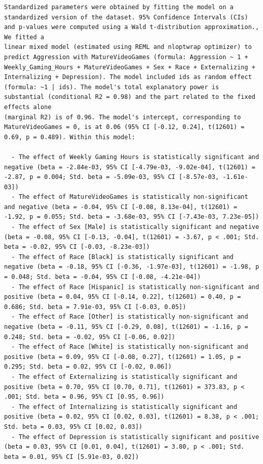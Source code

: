 \documentclass{article}
\begin{document}
\begin{verbatim}
Standardized parameters were obtained by fitting the model on a standardized version of the dataset. 95% Confidence Intervals (CIs) and p-values were computed using a Wald t-distribution approximation., We fitted a
linear mixed model (estimated using REML and nloptwrap optimizer) to predict Aggression with MatureVideoGames (formula: Aggression ~ 1 + Weekly_Gaming_Hours + MatureVideoGames + Sex + Race + Externalizing +
Internalizing + Depression). The model included ids as random effect (formula: ~1 | ids). The model's total explanatory power is substantial (conditional R2 = 0.98) and the part related to the fixed effects alone
(marginal R2) is of 0.96. The model's intercept, corresponding to MatureVideoGames = 0, is at 0.06 (95% CI [-0.12, 0.24], t(12601) = 0.69, p = 0.489). Within this model:

  - The effect of Weekly Gaming Hours is statistically significant and negative (beta = -2.84e-03, 95% CI [-4.79e-03, -9.02e-04], t(12601) = -2.87, p = 0.004; Std. beta = -5.09e-03, 95% CI [-8.57e-03, -1.61e-03])
  - The effect of MatureVideoGames is statistically non-significant and negative (beta = -0.04, 95% CI [-0.08, 8.13e-04], t(12601) = -1.92, p = 0.055; Std. beta = -3.68e-03, 95% CI [-7.43e-03, 7.23e-05])
  - The effect of Sex [Male] is statistically significant and negative (beta = -0.08, 95% CI [-0.13, -0.04], t(12601) = -3.67, p < .001; Std. beta = -0.02, 95% CI [-0.03, -8.23e-03])
  - The effect of Race [Black] is statistically significant and negative (beta = -0.18, 95% CI [-0.36, -1.97e-03], t(12601) = -1.98, p = 0.048; Std. beta = -0.04, 95% CI [-0.08, -4.21e-04])
  - The effect of Race [Hispanic] is statistically non-significant and positive (beta = 0.04, 95% CI [-0.14, 0.22], t(12601) = 0.40, p = 0.686; Std. beta = 7.91e-03, 95% CI [-0.03, 0.05])
  - The effect of Race [Other] is statistically non-significant and negative (beta = -0.11, 95% CI [-0.29, 0.08], t(12601) = -1.16, p = 0.248; Std. beta = -0.02, 95% CI [-0.06, 0.02])
  - The effect of Race [White] is statistically non-significant and positive (beta = 0.09, 95% CI [-0.08, 0.27], t(12601) = 1.05, p = 0.295; Std. beta = 0.02, 95% CI [-0.02, 0.06])
  - The effect of Externalizing is statistically significant and positive (beta = 0.70, 95% CI [0.70, 0.71], t(12601) = 373.83, p < .001; Std. beta = 0.96, 95% CI [0.95, 0.96])
  - The effect of Internalizing is statistically significant and positive (beta = 0.02, 95% CI [0.02, 0.03], t(12601) = 8.38, p < .001; Std. beta = 0.03, 95% CI [0.02, 0.03])
  - The effect of Depression is statistically significant and positive (beta = 0.03, 95% CI [0.01, 0.04], t(12601) = 3.80, p < .001; Std. beta = 0.01, 95% CI [5.91e-03, 0.02])


\end{verbatim}
\end{document}
